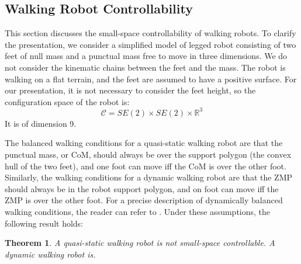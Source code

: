 \documentclass{article}
\newtheorem{theorem}{Theorem}
\begin{document}
\subsection{Walking Robot Controllability}
\label{sec:humanoid-ssc}

This section  discusses the small-space controllability of walking robots. To clarify
the presentation, we consider a simplified model of legged robot consisting of two feet
of null mass and a punctual mass free to move in three dimensions.
We do not consider 
the kinematic chains between the feet and the mass. The robot is walking on a flat terrain,
and the feet are assumed to have a positive surface. For our presentation, it is not 
necessary to consider the feet height, so the configuration space of the robot is:
\[
\mathcal{C} = SE(2) \times SE(2) \times \mathbb{R}^3
\]
It is of dimension 9.


The balanced walking conditions for a quasi-static walking robot are that the punctual
mass, or CoM, should always be over the support polygon (the convex hull of the two feet), and 
one foot can move iff the CoM is over the other foot. Similarly, the walking
conditions for a dynamic walking robot are that the ZMP should
always be in the robot support polygon, and on foot can move iff the ZMP is over the other 
foot. For a precise description of dynamically balanced walking conditions, the reader can refer
to \cite{wieber2002}. Under these assumptions, the following result holds:

\begin{theorem}
A quasi-static walking robot is not small-space controllable. A dynamic walking robot is.
\end{theorem}
\end{document}
